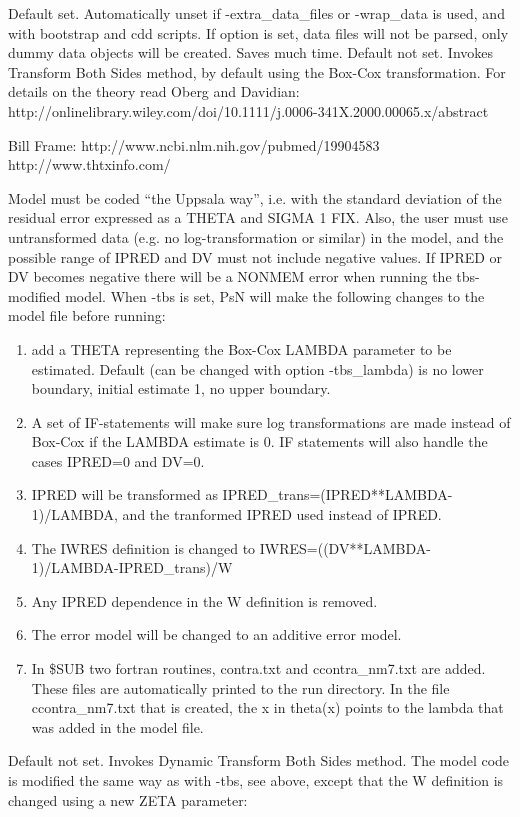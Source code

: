 \begin{optionlist}
\nextopt
{}
Default set. Automatically unset if -extra\_data\_files or -wrap\_data is used, and with bootstrap and cdd scripts. If option is set, data files will not be parsed, only dummy data objects will be created. Saves much time. 
\nextopt
{}
Default not set. Invokes Transform Both Sides method, by default using the Box-Cox transformation. For details on the theory read Oberg and Davidian: http://onlinelibrary.wiley.com/doi/10.1111/j.0006-341X.2000.00065.x/abstract

Bill Frame: http://www.ncbi.nlm.nih.gov/pubmed/19904583
 http://www.thtxinfo.com/
 
 Model must be coded “the Uppsala way”, i.e. with the standard deviation of the residual error expressed as a THETA and SIGMA 1 FIX. 
Also, the user must use untransformed data (e.g. no log-transformation or similar) in the model, and the possible range of IPRED and DV must not include negative values. If IPRED or DV becomes negative there will be a NONMEM error when running the tbs-modified model. 
 When -tbs is set, PsN will make the following changes to the model file before running:
\begin{enumerate}
	\item add a THETA representing the Box-Cox LAMBDA parameter to be estimated. Default (can be changed with option -tbs\_lambda) is no lower boundary, initial estimate 1, no upper boundary.
	\item A set of IF-statements will make sure log transformations are made instead of Box-Cox if the LAMBDA estimate is 0. IF statements will also handle the cases IPRED=0 and DV=0.
	\item IPRED will be transformed as 
 IPRED\_trans=(IPRED**LAMBDA-1)/LAMBDA, 
 and the tranformed  IPRED used instead of IPRED.  
	\item The IWRES definition is changed to 
 IWRES=((DV**LAMBDA-1)/LAMBDA-IPRED\_trans)/W
	\item Any IPRED dependence in the W definition is removed.
	\item The error model will be changed to an additive error model.
	\item In \$SUB two fortran routines, contra.txt and ccontra\_nm7.txt are added. These files are automatically printed to the run directory. In the file ccontra\_nm7.txt that is created, the x in theta(x) points to the lambda that was added in the model file.
\end{enumerate}
\nextopt
{}
Default not set. Invokes Dynamic Transform Both Sides method. The model code is modified the same way as with -tbs, see above, except that the W definition is changed using a new ZETA parameter:

\end{optionlist}
